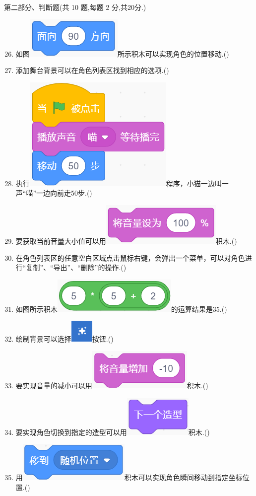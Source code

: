 \documentclass[10pt, a4paper]{article}
\begin{document}
    {\noindent\heiti 第二部分、判断题(共 10 题,每题 2 分,共20分.)}
    \begin{enumerate}
        \setcounter{enumi}{25}
        \item 如图\includegraphics[width=.1\textwidth]{26.png}所示积木可以实现角色的位置移动.(\qquad)

        \item 添加舞台背景可以在角色列表区找到相应的选项.(\qquad)
        
        \item 执行\includegraphics[width=.15\textwidth]{28.png}程序，小猫一边叫一声“喵”一边向前走50步.(\qquad)
  
        \item 要获取当前音量大小值可以用\includegraphics[width=.12\textwidth]{29.png}积木.(\qquad)
        
        \item 在角色列表区的任意空白区域点击鼠标右键，会弹出一个菜单，可以对角色进行“复制”、“导出”、“删除”的操作.(\qquad)

        \item 如图所示积木\includegraphics[width=.12\textwidth]{31.png}的运算结果是35.(\qquad)
        
        \item 绘制背景可以选择\includegraphics[width=.02\textwidth]{32.png}按钮.(\qquad)
        
        \item 要实现音量的减小可以用\includegraphics[width=.12\textwidth]{33.png}积木.(\qquad)
        
        \item 要实现角色切换到指定的造型可以用\includegraphics[width=.08\textwidth]{34.png}积木.(\qquad)
        
        \item 用\includegraphics[width=.12\textwidth]{35.png}积木可以实现角色瞬间移动到指定坐标位置.(\qquad)
    \end{enumerate}
\end{document}
